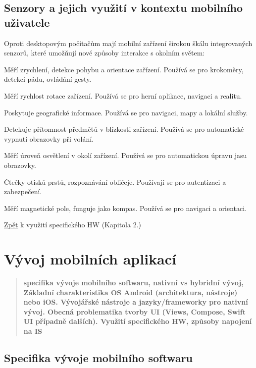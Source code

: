 \subsection{Senzory a jejich využití v kontextu mobilního uživatele}

Oproti desktopovým počítačům mají mobilní zařízení širokou škálu integrovaných senzorů, 
které umožňují nové způsoby interakce s okolním světem:

\begin{description}
    \label{des:senzory}
    \item[Akcelerometr] Měří zrychlení, detekce pohybu a orientace zařízení. 
    Používá se pro krokoměry, detekci pádu, ovládání gesty.
    \item[Gyroskop] Měří rychlost rotace zařízení. Používá se pro herní aplikace, 
    navigaci a realitu.
    \item[GPS] Poskytuje geografické informace. Používá se pro navigaci, mapy a 
    lokální služby.
    \item[Proximity senzor] Detekuje přítomnost předmětů v blízkosti zařízení. 
    Používá se pro automatické vypnutí obrazovky při volání.
    \item[Světelný senzor] Měří úroveň osvětlení v okolí zařízení. Používá se pro 
    automatickou úpravu jasu obrazovky.
    \item[Biometrické senzory] Čtečky otisků prstů, rozpoznávání obličeje. Používají 
    se pro autentizaci a zabezpečení.
    \item[Magnetometr] Měří magnetické pole, funguje jako kompas. Používá se pro 
    navigaci a orientaci.
\end{description}

\hyperref[sub:vsHW]{Zpět} k využití specifického HW (Kapitola 2.)

\section{Vývoj mobilních aplikací}
\begin{quote}
\textbf{specifika vývoje mobilního softwaru, nativní vs hybridní vývoj, Základní charakteristika OS Android (architektura, nástroje) nebo iOS. Vývojářské nástroje a jazyky/frameworky pro nativní vývoj. Obecná problematika tvorby UI (Views, Compose, Swift UI případně dalších). Využití specifického HW, způsoby napojení na IS}
\end{quote}

\subsection{Specifika vývoje mobilního softwaru}

